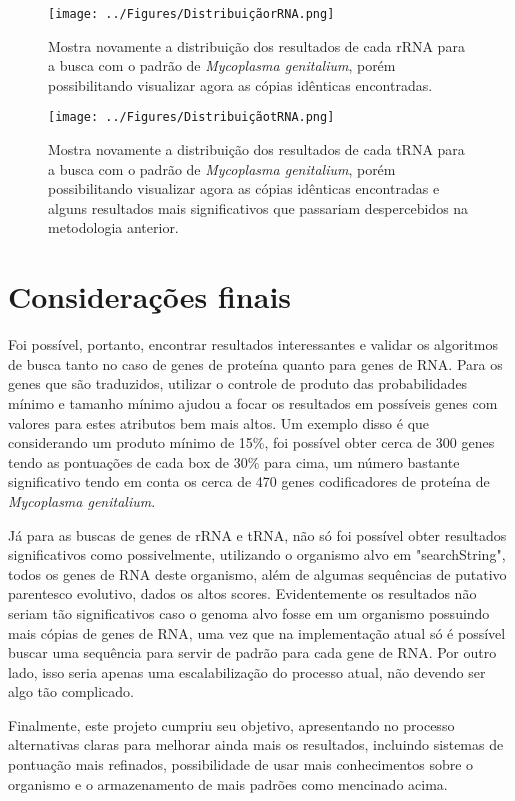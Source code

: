 \documentclass[brazilian,12pt,a4paper,final]{article}
\begin{document}
	\begin{figure}[hbtp]
		\begin{center}
			\texttt{[image: ../Figures/DistribuiçãorRNA.png]}
			\caption{Mostra novamente a distribuição dos resultados de cada rRNA para a busca com o padrão de \textit{Mycoplasma genitalium}, porém possibilitando visualizar agora as cópias idênticas encontradas.}
			\label{fig}
		\end{center}
	\end{figure}
	
	\begin{figure}[hbtp]
		\begin{center}
			\texttt{[image: ../Figures/DistribuiçãotRNA.png]}
			\caption{Mostra novamente a distribuição dos resultados de cada tRNA para a busca com o padrão de \textit{Mycoplasma genitalium}, porém possibilitando visualizar agora as cópias idênticas encontradas e alguns resultados mais significativos que passariam despercebidos na metodologia anterior.}
			\label{fig}
		\end{center}
	\end{figure}
	
	
	\section{Considerações finais}
	Foi possível, portanto, encontrar resultados interessantes e validar os algoritmos de busca tanto no caso de genes de proteína quanto para genes de RNA. Para os genes que são traduzidos, utilizar o controle de produto das probabilidades mínimo e tamanho mínimo ajudou a focar os resultados em possíveis genes com valores para estes atributos bem mais altos. Um exemplo disso é que considerando um produto mínimo de 15\%, foi possível obter cerca de 300 genes tendo as pontuações de cada box de 30\% para cima, um número bastante significativo tendo em conta os cerca de 470 genes codificadores de proteína de \textit{Mycoplasma genitalium}.
	
	\vspace{0.5cm}
	
	Já para as buscas de genes de rRNA e tRNA, não só foi possível obter resultados significativos como possivelmente, utilizando o organismo alvo em "searchString", todos os genes de RNA deste organismo, além de algumas sequências de putativo parentesco evolutivo, dados os altos scores. Evidentemente os resultados não seriam tão significativos caso o genoma alvo fosse em um organismo possuindo mais cópias de genes de RNA, uma vez que na implementação atual só é possível buscar uma sequência para servir de padrão para cada gene de RNA. Por outro lado, isso seria apenas uma escalabilização do processo atual, não devendo ser algo tão complicado.
	
	\vspace{0.5cm}
	
	Finalmente, este projeto cumpriu seu objetivo, apresentando no processo alternativas claras para melhorar ainda mais os resultados, incluindo sistemas de pontuação mais refinados, possibilidade de usar mais conhecimentos sobre o organismo e o armazenamento de mais padrões como mencinado acima. 
	
	
	
\end{document}
